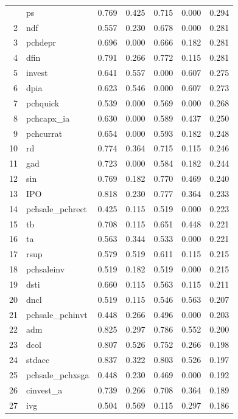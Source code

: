 \documentclass[12pt]{article}
\begin{document}
\begin{footnotesize}
\begin{longtable}{rl|c|c|c|c|c}
		\hline\hline
		\endfoot
		1 & ps & 0.769 & 0.425 & 0.715 & 0.000 & 0.294 \\ 
		2 & ndf & 0.557 & 0.230 & 0.678 & 0.000 & 0.281 \\ 
		3 & pchdepr & 0.696 & 0.000 & 0.666 & 0.182 & 0.281 \\ 
		4 & dfin & 0.791 & 0.266 & 0.772 & 0.115 & 0.281 \\ 
		5 & invest & 0.641 & 0.557 & 0.000 & 0.607 & 0.275 \\ 
		6 & dpia & 0.623 & 0.546 & 0.000 & 0.607 & 0.273 \\ 
		7 & pchquick & 0.539 & 0.000 & 0.569 & 0.000 & 0.268 \\ 
		8 & pchcapx\_ia & 0.630 & 0.000 & 0.589 & 0.437 & 0.250 \\ 
		9 & pchcurrat & 0.654 & 0.000 & 0.593 & 0.182 & 0.248 \\ 
		10 & rd & 0.774 & 0.364 & 0.715 & 0.115 & 0.246 \\ 
		11 & gad & 0.723 & 0.000 & 0.584 & 0.182 & 0.244 \\ 
		12 & sin & 0.769 & 0.182 & 0.770 & 0.469 & 0.240 \\ 
		13 & IPO & 0.818 & 0.230 & 0.777 & 0.364 & 0.233 \\ 
		14 & pchsale\_pchrect & 0.425 & 0.115 & 0.519 & 0.000 & 0.223 \\ 
		15 & tb & 0.708 & 0.115 & 0.651 & 0.448 & 0.221 \\ 
		16 & ta & 0.563 & 0.344 & 0.533 & 0.000 & 0.221 \\ 
		17 & rsup & 0.579 & 0.519 & 0.611 & 0.115 & 0.215 \\ 
		18 & pchsaleinv & 0.519 & 0.182 & 0.519 & 0.000 & 0.215 \\ 
		19 & dsti & 0.660 & 0.115 & 0.563 & 0.115 & 0.211 \\ 
		20 & dncl & 0.519 & 0.115 & 0.546 & 0.563 & 0.207 \\ 
		21 & pchsale\_pchinvt & 0.448 & 0.266 & 0.496 & 0.000 & 0.203 \\ 
		22 & adm & 0.825 & 0.297 & 0.786 & 0.552 & 0.200 \\ 
		23 & dcol & 0.807 & 0.526 & 0.752 & 0.266 & 0.198 \\ 
		24 & stdacc & 0.837 & 0.322 & 0.803 & 0.526 & 0.197 \\ 
		25 & pchsale\_pchxsga & 0.448 & 0.230 & 0.469 & 0.000 & 0.192 \\ 
		26 & cinvest\_a & 0.739 & 0.266 & 0.708 & 0.364 & 0.189 \\ 
		27 & ivg & 0.504 & 0.569 & 0.115 & 0.297 & 0.186 \\ 

\end{longtable}
\end{footnotesize}
\end{document}
